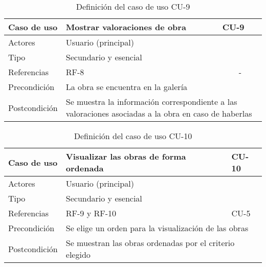 \begin{table}[H]
    \begin{tabular}{|p{3cm}|p{5cm}|p{2cm}|}
        \hline
        Caso de uso & Mostrar valoraciones de obra & CU-9 \\
        \hline
        Actores & \multicolumn{2}{|p{7cm}|}{Usuario (principal)} \\
        \hline
        Tipo & \multicolumn{2}{|p{7cm}|}{Secundario y esencial} \\
        \hline
        Referencias & RF-8 & \multicolumn{1}{|c|}{-} \\
        \hline
        Precondición & \multicolumn{2}{|p{7cm}|}{La obra se encuentra
        en la galería} \\
        \hline
        Postcondición & \multicolumn{2}{|p{7cm}|}{Se muestra la información
        correspondiente a las valoraciones asociadas a la obra en caso de haberlas} \\
        \hline
    \end{tabular}
    \caption{Definición del caso de uso CU-9}
    \label{tab:cu_9}
\end{table}

\begin{table}[H]
    \begin{tabular}{|p{3cm}|p{5cm}|p{2cm}|}
        \hline
        Caso de uso & Visualizar las obras de forma ordenada & CU-10 \\
        \hline
        Actores & \multicolumn{2}{|p{7cm}|}{Usuario (principal)} \\
        \hline
        Tipo & \multicolumn{2}{|p{7cm}|}{Secundario y esencial} \\
        \hline
        Referencias & RF-9 y RF-10 & CU-5 \\
        \hline
        Precondición & \multicolumn{2}{|p{7cm}|}{Se elige un orden para
        la visualización de las obras} \\
        \hline
        Postcondición & \multicolumn{2}{|p{7cm}|}{Se muestran las obras
        ordenadas por el criterio elegido} \\
        \hline
    \end{tabular}
    \caption{Definición del caso de uso CU-10}
    \label{tab:cu_10}
\end{table}

